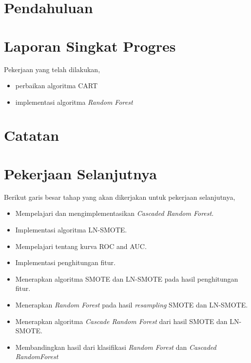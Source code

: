 






\section{Pendahuluan}



\section{Laporan Singkat Progres}

Pekerjaan yang telah dilakukan,
\begin{itemize}
\item perbaikan algoritma CART
\item implementasi algoritma \textit{Random Forest}
\end{itemize}

\section{Catatan}



\clearpage
\section{Pekerjaan Selanjutnya}

Berikut garis besar tahap yang akan dikerjakan untuk pekerjaan selanjutnya,

\begin{itemize}
\item Mempelajari dan mengimplementasikan \textit{Cascaded Random Forest}.
\item Implementasi algoritma LN-SMOTE.
\item Mempelajari tentang kurva ROC and AUC.
\item Implementasi penghitungan fitur.
\item Menerapkan algoritma SMOTE dan LN-SMOTE pada hasil penghitungan fitur.
\item Menerapkan \textit{Random Forest} pada hasil \textit{resampling} SMOTE
dan LN-SMOTE.
\item Menerapkan algoritma \textit{Cascade Random Forest} dari hasil SMOTE dan
LN-SMOTE.
\item Membandingkan hasil dari klasifikasi \textit{Random Forest} dan
\textit{Cascaded RandomForest}
\end{itemize}

\clearpage
{}

\advisorsignature

\clearpage
{}
\printbibliography

\newpage
\appendix



